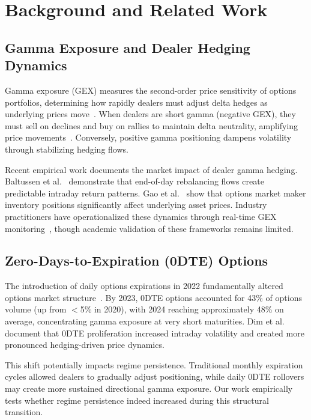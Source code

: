 \section{Background and Related Work}

\subsection{Gamma Exposure and Dealer Hedging Dynamics}

Gamma exposure (GEX) measures the second-order price sensitivity of options portfolios, determining how rapidly dealers must adjust delta hedges as underlying prices move~\citep{black1973pricing}. When dealers are short gamma (negative GEX), they must sell on declines and buy on rallies to maintain delta neutrality, amplifying price movements~\citep{ni2005stock}. Conversely, positive gamma positioning dampens volatility through stabilizing hedging flows.

Recent empirical work documents the market impact of dealer gamma hedging. Baltussen et al.~\citep{baltussen2021hedging} demonstrate that end-of-day rebalancing flows create predictable intraday return patterns. Gao et al.~\citep{gao2018market} show that options market maker inventory positions significantly affect underlying asset prices. Industry practitioners have operationalized these dynamics through real-time GEX monitoring~\citep{spotgamma2021,fishman2023gamma}, though academic validation of these frameworks remains limited.

\subsection{Zero-Days-to-Expiration (0DTE) Options}

The introduction of daily options expirations in 2022 fundamentally altered options market structure~\citep{cboe2024zero}. By 2023, 0DTE options accounted for 43\% of options volume (up from $<$5\% in 2020), with 2024 reaching approximately 48\% on average, concentrating gamma exposure at very short maturities. Dim et al.~\citep{dim2025zero} document that 0DTE proliferation increased intraday volatility and created more pronounced hedging-driven price dynamics.

This shift potentially impacts regime persistence. Traditional monthly expiration cycles allowed dealers to gradually adjust positioning, while daily 0DTE rollovers may create more sustained directional gamma exposure. Our work empirically tests whether regime persistence indeed increased during this structural transition.

